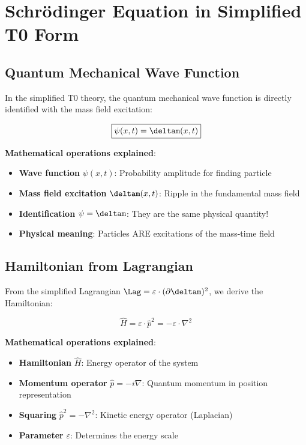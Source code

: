 	\section{Schrödinger Equation in Simplified T0 Form}
	
	\subsection{Quantum Mechanical Wave Function}
	
	In the simplified T0 theory, the quantum mechanical wave function is directly identified with the mass field excitation:
	
	\begin{equation}
		\boxed{\psi(x,t) = \deltam(x,t)}
		\label{eq:wavefunction_identification}
	\end{equation}
	
	\textbf{Mathematical operations explained}:
	\begin{itemize}
		\item \textbf{Wave function} $\psi(x,t)$: Probability amplitude for finding particle
		\item \textbf{Mass field excitation} $\deltam(x,t)$: Ripple in the fundamental mass field
		\item \textbf{Identification} $\psi = \deltam$: They are the same physical quantity!
		\item \textbf{Physical meaning}: Particles ARE excitations of the mass-time field
	\end{itemize}
	
	\subsection{Hamiltonian from Lagrangian}
	
	From the simplified Lagrangian $\Lag = \varepsilon \cdot (\partial \deltam)^2$, we derive the Hamiltonian:
	
	\begin{equation}
		\hat{H} = \varepsilon \cdot \hat{p}^2 = -\varepsilon \cdot \nabla^2
		\label{eq:simplified_hamiltonian}
	\end{equation}
	
	\textbf{Mathematical operations explained}:
	\begin{itemize}
		\item \textbf{Hamiltonian} $\hat{H}$: Energy operator of the system
		\item \textbf{Momentum operator} $\hat{p} = -i\nabla$: Quantum momentum in position representation
		\item \textbf{Squaring} $\hat{p}^2 = -\nabla^2$: Kinetic energy operator (Laplacian)
		\item \textbf{Parameter} $\varepsilon$: Determines the energy scale
	\end{itemize}
	
